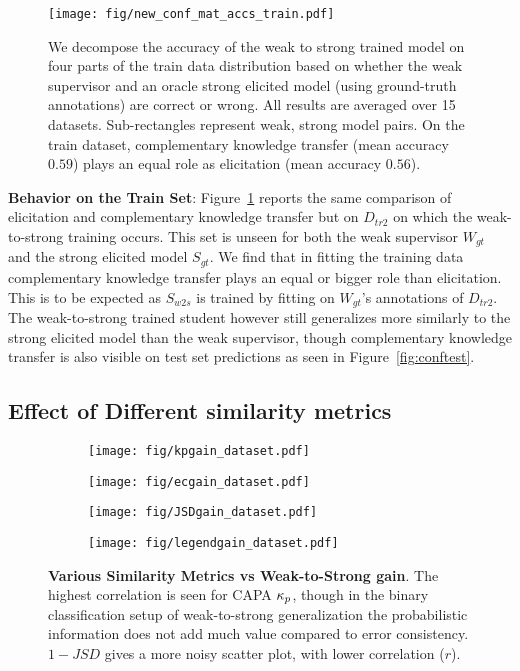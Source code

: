 \begin{figure}[t]
    \centering
    \texttt{[image: fig/new\_conf\_mat\_accs\_train.pdf]}
    \caption{We decompose the accuracy of the weak to strong trained model on four parts of the train data distribution based on whether the weak supervisor and an oracle strong elicited model (using ground-truth annotations) are correct or wrong. All results are averaged over 15 datasets. Sub-rectangles represent weak, strong model pairs. On the train dataset, complementary knowledge transfer (mean accuracy $0.59$) plays an equal role as elicitation (mean accuracy $0.56$).}
    \label{fig:conftrain}
\end{figure}

\textbf{Behavior on the Train Set}: Figure~\ref{fig:conftrain} reports the same comparison of elicitation and complementary knowledge transfer but on $D_{tr2}$ on which the weak-to-strong training occurs. This set is unseen for both the weak supervisor $W_{gt}$ and the strong elicited model $S_{gt}$. We find that in fitting the training data complementary knowledge transfer plays an equal or bigger role than elicitation. This is to be expected as $S_{w2s}$ is trained by fitting on $W_{gt}$'s annotations of $D_{tr2}$. The weak-to-strong trained student however still generalizes more similarly to the strong elicited model than the weak supervisor, though complementary knowledge transfer is also visible on test set predictions as seen in Figure~\ref{fig:conftest}. 


\subsection{Effect of Different similarity metrics}
\begin{figure}[h!]
  \centering
  \begin{subfigure}{0.33\textwidth}
    \texttt{[image: fig/kpgain\_dataset.pdf]}
  \end{subfigure}\hfill
  \begin{subfigure}{0.33\textwidth}
    \texttt{[image: fig/ecgain\_dataset.pdf]}
  \end{subfigure}
  \begin{subfigure}{0.33\textwidth}
    \texttt{[image: fig/JSDgain\_dataset.pdf]}
  \end{subfigure}\hfill
  \begin{subfigure}{\textwidth}
    \texttt{[image: fig/legendgain\_dataset.pdf]}
  \end{subfigure}
  \caption{\textbf{Various Similarity Metrics vs Weak-to-Strong gain}. The highest correlation is seen for CAPA $\kappa_{p}$, though in the binary classification setup of weak-to-strong generalization the probabilistic information does not add much value compared to error consistency. $1 - JSD$ gives a more noisy scatter plot, with lower correlation ($r$).}
  \label{fig:similarityvsgain_dataset}
\end{figure}

